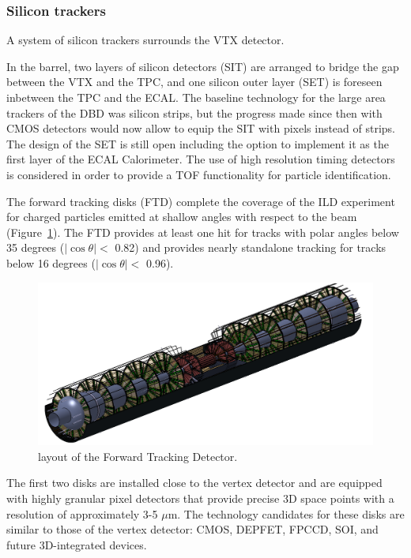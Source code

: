 \vspace{1cm}
\subsubsection*{\bf Silicon trackers}

A system of silicon trackers surrounds the VTX detector. 

In the barrel, two layers of silicon detectors (SIT) are arranged to bridge the gap between the VTX and the TPC, and one silicon outer layer (SET) is foreseen inbetween the TPC and the ECAL. The baseline technology for the large area trackers of the DBD was silicon strips, but the progress made since then with CMOS detectors would now allow to equip the SIT with pixels instead of strips. The design of the SET is still open including the option to implement it as the first layer of the ECAL Calorimeter. The use of high resolution timing detectors is considered in order to provide a TOF functionality for particle identification. 

The forward tracking disks (FTD) complete the coverage of the ILD experiment for charged particles emitted at shallow angles with respect to the beam (Figure~\ref{fig:det:FTD}). The FTD provides at least one hit for tracks with polar angles below 35 degrees ($|\cos \theta| < $ 0.82) and provides nearly standalone tracking for tracks below 16 degrees ($|\cos \theta| <$ 0.96).

\begin{figure}[t!]
\centering
\includegraphics[width=0.75\hsize]{Detector/fig/FTD.png}
\caption{layout of the Forward Tracking Detector.}
\label{fig:det:FTD}
\end{figure}

The first two disks are installed close to the vertex detector and are equipped with highly granular pixel detectors that provide precise 3D space points with a resolution of approximately 3-5 $\mu\mathrm{m}$. The technology candidates for these disks are similar to those of the vertex detector: CMOS, DEPFET, FPCCD, SOI, and future 3D-integrated devices. 


